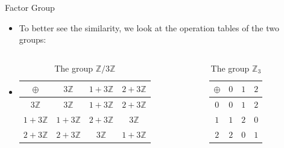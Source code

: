 \documentclass[ %
 10pt, xcolor={dvipsnames,svgnames,x11names,hyperref},
   hyperref={colorlinks=true,citecolor=green,linkcolor=DarkRed,urlcolor=ProcessBlue,anchorcolor=blue}
  ]{beamer}
\newenvironment{stepitemize}{\begin{itemize}[<+->]}{\end{itemize} }
\newcommand{\Z}{\mathbb{Z}}
\begin{document}
\begin{frame}{Factor Group}
\begin{stepitemize}
\item To better see the similarity, we look at the operation tables of the two groups:
\item[]
\begin{columns}
        \begin{column}{0.4\textwidth}
            \begin{table}
            \begin{tabular}{ c| c | c |c}
$\oplus$  & {\color{darkgray} $3\Z$} & {\color{blue} $1+3\Z$} &  {\color{red} $2+3\Z$}\\
\hline
{\color{darkgray} $3\Z$}&{\color{darkgray} $3\Z$} & {\color{blue} $1+3\Z$} & {\color{red} $2+3\Z$}\\
\hline
{\color{blue} $1+3\Z$} &{\color{blue} $1+3\Z$} & {\color{red} $2+3\Z$} & {\color{darkgray} $3\Z$}\\
\hline
{\color{red} $2+3\Z$}&{\color{red} $2+3\Z$} & {\color{darkgray} $3\Z$} & {\color{blue} $1+3\Z$}
\end{tabular}

            \caption{The group $\Z/3\Z$}
            \end{table}
        \end{column}
        \begin{column}{0.3\textwidth}
            \begin{table}
            \begin{tabular}{ c| c | c |c}
$\oplus$  & {\color{darkgray} $0$} & {\color{blue} $1$} &  {\color{red} $2$}\\
\hline
{\color{darkgray} $0$}&{\color{darkgray} $0$} & {\color{blue} $1$} & {\color{red} $2$}\\
\hline
{\color{blue} $1$} &{\color{blue} $1$} & {\color{red} $2$} & {\color{darkgray} $0$}\\
\hline
{\color{red} $2$}&{\color{red} $2$} & {\color{darkgray} $0$} & {\color{blue} $1$}
\end{tabular}
            \caption{The group $\Z_3$}
            \end{table}
        \end{column}
    \end{columns}
    
\end{stepitemize}
    
\end{frame}
\end{document}
